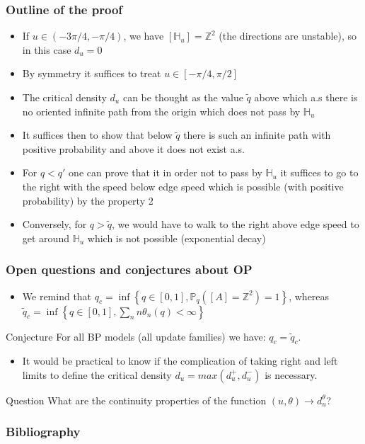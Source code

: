 \begin{frame}
	\frametitle{Outline of the proof}
	\begin{itemize}
		\item If $u \in (-3\pi/4, -\pi/4)$, we have $[\mathbb{H}_{u}] = \mathbb{Z}^{2}$ (the directions are unstable), so in this case $d_{u} = 0$
		\item By symmetry it suffices to treat $u \in [-\pi/4, \pi/2]$
		\item The critical density $d_{u}$ can be thought as the value $\tilde{q}$ above which a.s there is no oriented infinite path from the origin which does not pass by $\mathbb{H}_{u}$
		\item It suffices then to show that below $\tilde{q}$ there is such an infinite path with positive probability and above it does not exist a.s.
		\item For $q < q'$ one can prove that it in order not to pass by $\mathbb{H}_{u}$ it suffices to go to the right with the speed below edge speed which is possible (with positive probability) by the property 2
		\item Conversely, for $q > \tilde{q}$, we would have to walk to the right above edge speed to get around $\mathbb{H}_{u}$ which is not possible (exponential decay) 
	\end{itemize}
\end{frame}

\begin{frame}
	\frametitle {Open questions and conjectures about OP}
	\begin{itemize}
		\item We remind that $q_{c}=\inf \left\{q \in[0,1], \mathbb{P}_{q}\left([A]=\mathbb{Z}^{2}\right)=1\right\}$, whereas $\tilde{q}_{c}=\inf \left\{q \in[0,1], \sum_{n} n \theta_{n}(q)<\infty\right\}$
	\end{itemize}
	\begin{block}{Conjecture}
		For all BP models (all update families) we have: $q_{c} = \tilde{q}_{c}$.
	\end{block}
	\begin{itemize}
		\item It would be practical to know if the complication of taking right and left limits to define the critical density $d_{u} = max(d_{u}^{+}, d_{u}^{-})$ is necessary.
	\end{itemize}
	\begin{block}{Question}
		What are the continuity properties of the function $(u, \theta) \rightarrow d_{u}^{\theta}$?
	\end{block}
\end{frame}

\begin{frame}
	\frametitle{Bibliography}
	
\end{frame}


